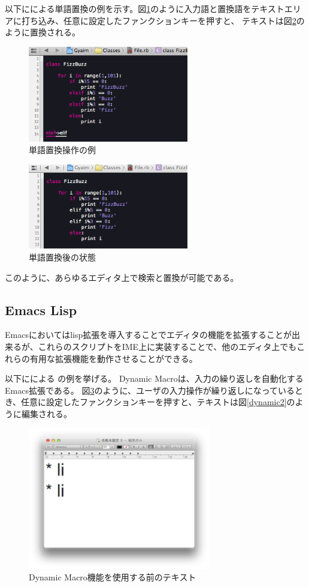 以下に{\system}による単語置換の例を示す。図\ref{search1}のように入力語と置換語をテキストエリアに打ち込み、任意に設定したファンクションキーを押すと、
テキストは図\ref{search2}のように置換される。

\begin{figure}[H]
\centerline{\includegraphics[width=70mm,bb=0 0 360 215]{figures/search_replace1.png}}
\caption{単語置換操作の例}
\label{search1}
\end{figure}

\begin{figure}[H]
\centerline{\includegraphics[width=70mm,bb=0 0 360 191]{figures/search_replace2.png}}
\caption{単語置換後の状態}
\label{search2}
\end{figure}

このように、あらゆるエディタ上で検索と置換が可能である。

\subsection{Emacs Lisp}
Emacsにおいてはlisp拡張を導入することでエディタの機能を拡張することが出来るが、これらのスクリプトをIME上に実装することで、他のエディタ上でもこれらの有用な拡張機能を動作させることができる。

以下に{\system}による \cite{DynamicMacro}の例を挙げる。
Dynamic Macroは、入力の繰り返しを自動化するEmacs拡張である。
図\ref{dynamic1}のように、ユーザの入力操作が繰り返しになっているとき、任意に設定したファンクションキーを押すと、テキストは図\ref{dynamic2}のように編集される。

\begin{figure}[H]
\centerline{\includegraphics[width=80mm,bb=0 0 360 190]{figures/dynamic1.png}}
\caption{Dynamic Macro機能を使用する前のテキスト}
\label{dynamic1}
\end{figure}

